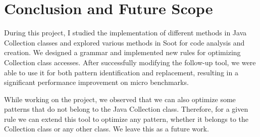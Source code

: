 \chapter{Conclusion and Future Scope}

During this project, I studied the implementation of different methods in Java Collection classes and explored various methods in Soot for code analysis and creation. We designed a grammar and implemented new rules for optimizing Collection class accesses. After successfully modifying the follow-up tool, we were able to use it for both pattern identification and replacement, resulting in a significant performance improvement on micro benchmarks.

While working on the project, we observed that we can also optimize some patterns that do not belong to the Java Collection class. Therefore, for a given rule we can extend this tool to optimize any pattern, whether it belongs to the Collection class or any other class. We leave this as a future work.
